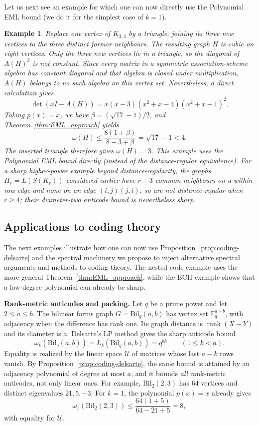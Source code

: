 \documentclass[11pt]{article}
\theoremstyle{plain}
\newtheorem{example}{Example}[section]
\numberwithin{equation}{section}
\begin{document}
Let us next see an example for which one can now directly use the Polynomial EML bound (we do it for the simplest case of $k=1$).

\begin{example}
Replace one vertex of $K_{3,3}$ by a triangle, joining its three new vertices to the three distinct former neighbours. The resulting graph $H$ is cubic on eight vertices. Only the three new vertices lie in a triangle, so the diagonal of $A(H)^3$ is not constant. Since every matrix in a symmetric association-scheme algebra has constant diagonal and that algebra is closed under multiplication, $A(H)$ belongs to no such algebra on this vertex set. Nevertheless, a direct calculation gives
\[
 \det(xI-A(H))=x(x-3)(x^2+x-4)(x^2+x-1)^2.
\]
Taking $p(x)=x$, we have $\beta=(\sqrt{17}-1)/2$, and Theorem~\ref{thm:EML_approach} yields
\[
 \omega(H)\le\frac{8(1+\beta)}{8-3+\beta}
 =\sqrt{17}-1<4.
\]
The inserted triangle therefore gives $\omega(H)=3$. This example uses the Polynomial EML bound directly (instead of the distance-regular equivalence). For a sharp higher-power example beyond distance-regularity, the graphs $H_r=L(S(K_r))$ considered earlier have $r-3$ common neighbours on a within-row edge and none on an edge $(i,j)(j,i)$, so are not distance-regular when $r\ge4$; their diameter-two anticode bound is nevertheless sharp.
\end{example}



\subsection{Applications to coding theory}
The next  examples illustrate how one can now use Proposition~\ref{prop:coding-delsarte} and the spectral machinery we propose to inject alternative spectral arguments and methods to coding theory. The nested-code example uses the more general Theorem~\ref{thm:EML_approach}, while the BCH example shows that a low-degree polynomial can already be sharp.


\medskip
\textbf{Rank-metric anticodes and packing.}
Let $q$ be a prime power and let $2\le a\le b$. The bilinear forms graph $G=\mathrm{Bil}_q(a,b)$ has vertex set $\mathbb F_q^{a\times b}$, with adjacency when the difference has rank one. Its graph distance is $\operatorname{rank}(X-Y)$ and its diameter is $a$. Delsarte's LP method gives the sharp anticode bound~\cite{Delsarte_1978,Tanaka_2006,Tanaka_2012}
\begin{equation}\label{eq:coding-rank}
 \omega_k(\mathrm{Bil}_q(a,b))=L_k(\mathrm{Bil}_q(a,b))=q^{bk}
 \qquad(1\le k<a).
\end{equation}
Equality is realized by the linear space $\mathcal U$ of matrices whose last $a-k$ rows vanish. By Proposition~\ref{prop:coding-delsarte}, the same bound is attained by an adjacency polynomial of degree at most $a$, and it bounds \emph{all} rank-metric anticodes, not only linear ones. For example, $\mathrm{Bil}_2(2,3)$ has $64$ vertices and distinct eigenvalues $21,5,-3$. For $k=1$, the polynomial $p(x)=x$ already gives
\[
 \omega_1(\mathrm{Bil}_2(2,3))\le
 \frac{64(1+5)}{64-21+5}=8,
\]
with equality for $\mathcal U$.
\end{document}
